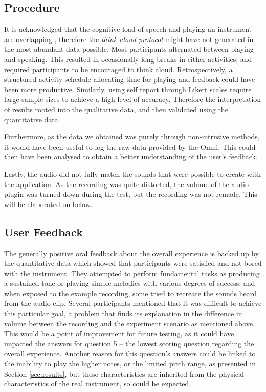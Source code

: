 \documentclass[dvipsnames, pdftex]{article}
\begin{document}
\subsection{Procedure}
It is acknowledged that the cognitive load of speech and playing an instrument are overlapping \cite{Stowell2009}, therefore the \textit{think aloud protocol} might have not generated in the most abundant data possible. Most participants alternated between playing and speaking. This resulted in occasionally long breaks in either activities, and required participants to be encouraged to think aloud. Retrospectively, a structured activity schedule allocating time for playing and feedback could have been more productive. Similarly, using self report through Likert scales require large sample sizes to achieve a high level of accuracy\cite{Stowell2009}. Therefore the interpretation of results rooted into the qualitative data, and then validated using the quantitative data. 

Furthermore, as the data we obtained was purely through non-intrusive methods, it would have been useful to log the raw data provided by the Omni. This could then have been analysed to obtain a better understanding of the user's feedback.

Lastly, the audio did not fully match the sounds that were possible to create with the application. As the recording was quite distorted, the volume of the audio plugin was turned down during the test, but the recording was not remade. This will be elaborated on below.

\subsection{User Feedback}
The generally positive oral feedback about the overall experience is backed up by the quantitative data which showed that participants were satisfied and not bored with the instrument. They attempted to perform fundamental tasks as producing a sustained tone or playing simple melodies with various degrees of success, and when exposed to the example recording, some tried to recreate the sounds heard from the audio clip. Several participants mentioned that it was difficult to achieve this particular goal, a problem that finds its explanation in the difference in volume between the recording and the experiment scenario as mentioned above. This would be a point of improvement for future testing, as it could have impacted the answers for question 5 -- the lowest scoring question regarding the overall experience. Another reason for this question's answers could be linked to the inability to play the higher notes, or the limited pitch range, as presented in Section \ref{sec:results}, but these characteristics are inherited from the physical characteristics of the real instrument, so could be expected.
\end{document}
